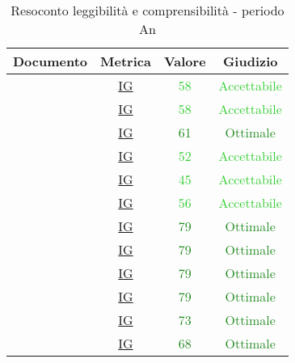 							\begin{table}[H]
								\centering
								\small
								\begin{tabular}{c | c | c | c}
									\hline
									\textbf{Documento} & \textbf{Metrica}    & \textbf{Valore} & \textbf{Giudizio} \\ \hline
									      \pdpvuno        & \hyperref[MLEC]{IG} &  \textcolor{LimeGreen}{58}              & \textcolor{LimeGreen}{Accettabile} \\
									      \pdqvuno        & \hyperref[MLEC]{IG} &  \textcolor{LimeGreen}{58}               &  \textcolor{LimeGreen}{Accettabile} \\
									      \ndpvuno        & \hyperref[MLEC]{IG} &  \textcolor{ForestGreen}{61}               & \textcolor{ForestGreen}{Ottimale}\\
									      \sdfv        & \hyperref[MLEC]{IG} &  \textcolor{LimeGreen}{52}               &  \textcolor{LimeGreen}{Accettabile}\\
									      \adrvuno        & \hyperref[MLEC]{IG} &  \textcolor{LimeGreen}{45}               &  \textcolor{LimeGreen}{Accettabile}\\
									       \glvuno        & \hyperref[MLEC]{IG} &  \textcolor{LimeGreen}{56}               & \textcolor{LimeGreen}{Accettabile} \\
									      \vunoi       & \hyperref[MLEC]{IG} &  \textcolor{ForestGreen}{79}               & \textcolor{ForestGreen}{Ottimale}\\
									      \vduei       & \hyperref[MLEC]{IG} &  \textcolor{ForestGreen}{79}               & \textcolor{ForestGreen}{Ottimale}\\
									      \vtrei       & \hyperref[MLEC]{IG} &  \textcolor{ForestGreen}{79}               & \textcolor{ForestGreen}{Ottimale}\\
									    \vquattroi     & \hyperref[MLEC]{IG} &  \textcolor{ForestGreen}{79}               & \textcolor{ForestGreen}{Ottimale}\\
									      \vunoe       & \hyperref[MLEC]{IG} &   \textcolor{ForestGreen}{73}              & \textcolor{ForestGreen}{Ottimale}\\
									      \vduee       & \hyperref[MLEC]{IG} &   \textcolor{ForestGreen}{68}              & \textcolor{ForestGreen}{Ottimale}\\ \hline
								\end{tabular}
								\caption{Resoconto leggibilità e comprensibilità - periodo An}
								\label{tab_resoconto_leggibilità_e_comprensibilità_PA}
							\end{table}
			
